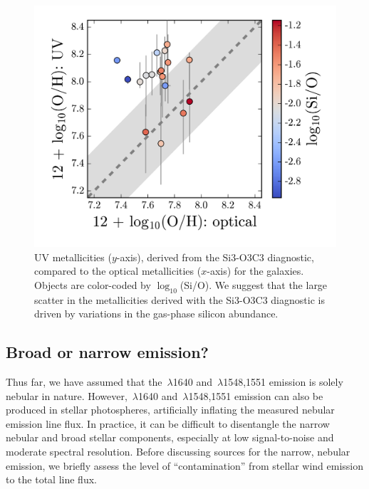 \documentclass[preprint2]{aastex62}
\newcommand{\heii}{\ion{He}{2}}
\newcommand{\civ}{\ion{C}{4}}
\begin{document}
\begin{figure}
  \begin{center}
    \includegraphics[width=\linewidth]{figs/f6.png}
    \caption{UV metallicities ($y$-axis), derived from the Si3-O3C3 diagnostic, compared to the optical metallicities ($x$-axis) for the \citet{Berg+2016} galaxies. Objects are color-coded by $\log_{10}$(Si/O). We suggest that the large scatter in the metallicities derived with the Si3-O3C3 diagnostic is driven by variations in the gas-phase silicon abundance.}
    \label{fig:SiO}
  \end{center}
\end{figure}

\subsection{Broad or narrow emission?} \label{sec:discussion:broad}

Thus far, we have assumed that the \heii$\,\lambda$1640 and \civ$\,\lambda$1548,1551 emission is solely nebular in nature. However, \heii$\,\lambda$1640 and \civ$\,\lambda$1548,1551 emission can also be produced in stellar photospheres, artificially inflating the measured nebular emission line flux. In practice, it can be difficult to disentangle the narrow nebular and broad stellar components, especially at low signal-to-noise and moderate spectral resolution. Before discussing sources for the narrow, nebular emission, we briefly assess the level of ``contamination'' from stellar wind emission to the total line flux.
\end{document}
